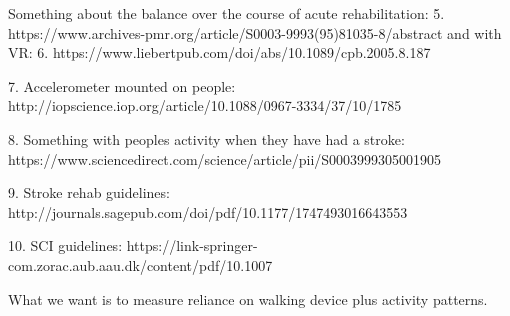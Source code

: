Something about the balance over the course of acute rehabilitation: 5. https://www.archives-pmr.org/article/S0003-9993(95)81035-8/abstract and with VR: 6. https://www.liebertpub.com/doi/abs/10.1089/cpb.2005.8.187

7. Accelerometer mounted on people: http://iopscience.iop.org/article/10.1088/0967-3334/37/10/1785

8. Something with peoples activity when they have had a stroke: https://www.sciencedirect.com/science/article/pii/S0003999305001905

9. Stroke rehab guidelines: http://journals.sagepub.com/doi/pdf/10.1177/1747493016643553

10. SCI guidelines: https://link-springer-com.zorac.aub.aau.dk/content/pdf/10.1007%

What we want is to measure reliance on walking device plus activity patterns.